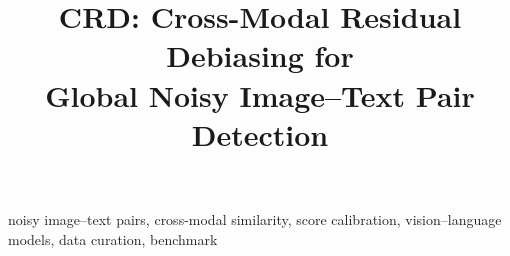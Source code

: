 \documentclass[conference]{IEEEtran}
\begin{document}
\title{CRD: Cross-Modal Residual Debiasing for\\
Global Noisy Image--Text Pair Detection}

\author{
}

\maketitle



\begin{IEEEkeywords}
noisy image--text pairs, cross-modal similarity, score calibration,
vision--language models, data curation, benchmark
\end{IEEEkeywords}











{\small


}
\end{document}
